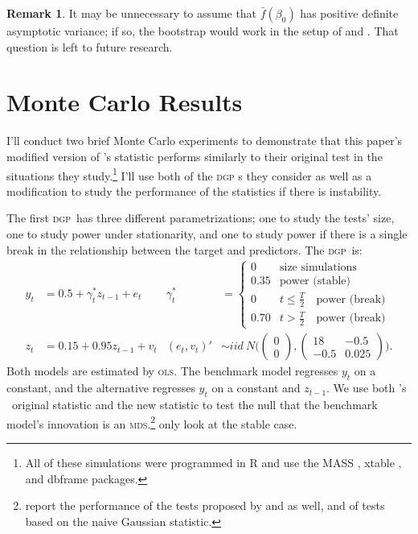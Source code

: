 \documentclass[11pt,fleqn]{article}
\newcommand\citepos[2][]{\citeauthor{#2}'s \citeyearpar[#1]{#2}}
\newcommand\poscw{\citeauthor{ClW:06}'s \citeyearpar{ClW:06,ClW:07}}
\theoremstyle{definition}
\newtheorem{rem}{Remark}
\newcommand{\dgp}{\textsc{dgp}}
\newcommand{\mds}{\textsc{mds}}
\newcommand{\ols}{\textsc{ols}}
\begin{document}
\begin{rem}
  It may be unnecessary to assume that $\bar{f}(\beta_0)$ has positive
  definite asymptotic variance; if so, the bootstrap would work in the
  setup of \citet{ClM:05,ClM:01} and \citet{Mcc:07}.  That question is
  left to future research.
\end{rem}

\section{Monte Carlo Results}\label{sec:2}
I'll conduct two brief Monte Carlo experiments to demonstrate that
this paper's modified version of \citepos{ClW:07} statistic performs
similarly to their original test in the situations they
study.\footnote{All of these simulations were programmed in R
  \citep[version 2.14.0]{R} and use the \textsc{MASS} \citep[version
  info]{VeR:02}, xtable \citep[1.6-0]{Dah:09}, and dbframe
  \citep[version 0.2.1]{Cal:10b} packages.}  I'll use both of the \dgp
s they consider as well as a modification to study the performance of
the statistics if there is instability.

The first \dgp\ has three different parametrizations; one to study the
tests' size, one to study power under stationarity, and one to study
power if there is a single break in the relationship between the
target and predictors.  The \dgp\ is:
\begin{align*}
  y_t &= 0.5 + \gamma^{*}_t z_{t-1} + e_t &
  \gamma^{*}_t &=
  \begin{cases}
    0    & \text{size simulations} \\
    0.35 & \text{power (stable)} \\
    0    & t \leq \tfrac{T}{2} \quad \text{power (break)} \\
    0.70 & t > \tfrac{T}{2} \quad \text{power (break)}
  \end{cases}\\\nonumber
  z_t &= 0.15 + 0.95 z_{t-1} + v_t &
  (e_t, v_t)' &\sim iid\ N\Bigg(\begin{pmatrix} 0 \\ 0
  \end{pmatrix}
   , \begin{pmatrix} 18 & -
    0.5 \\ -0.5 & 0.025 \end{pmatrix}\Bigg).
\end{align*}
Both models are estimated by \ols. The benchmark model regresses $y_t$
on a constant, and the alternative regresses $y_t$ on a constant and
$z_{t-1}$.  We use both \poscw\ original statistic and the new
statistic to test the null that the benchmark model's innovation is an
\mds.\footnote{\citet{ClW:07} report the performance of the tests
  proposed by \citet{CCS:01} and \citet{ClM:05} as well, and of tests
  based on the naive Gaussian statistic.}  \citet{ClW:06,ClW:07} only
look at the stable case.
\end{document}
